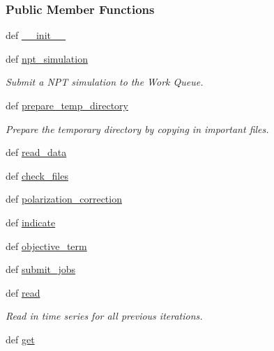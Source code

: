 \subsubsection*{Public Member Functions}
\begin{DoxyCompactItemize}
\item 
def \hyperlink{classforcebalance_1_1tinkerio_1_1Liquid__TINKER_a307529b9902b34a790a8b016e153c7d6}{\-\_\-\-\_\-init\-\_\-\-\_\-}
\item 
def \hyperlink{classforcebalance_1_1tinkerio_1_1Liquid__TINKER_a53a10ac99cdfbf026526ed625d4de809}{npt\-\_\-simulation}
\begin{DoxyCompactList}\small\item\em Submit a N\-P\-T simulation to the Work Queue. \end{DoxyCompactList}\item 
def \hyperlink{classforcebalance_1_1liquid_1_1Liquid_a550ea5869db69be9f3b8f0b83b07d8cb}{prepare\-\_\-temp\-\_\-directory}
\begin{DoxyCompactList}\small\item\em Prepare the temporary directory by copying in important files. \end{DoxyCompactList}\item 
def \hyperlink{classforcebalance_1_1liquid_1_1Liquid_a08b698af913d56f780d0587821c922cd}{read\-\_\-data}
\item 
def \hyperlink{classforcebalance_1_1liquid_1_1Liquid_a50d90e978d689cfebb67649942719b69}{check\-\_\-files}
\item 
def \hyperlink{classforcebalance_1_1liquid_1_1Liquid_a51ea9d9fb4418ec2497fe8e2d8033d41}{polarization\-\_\-correction}
\item 
def \hyperlink{classforcebalance_1_1liquid_1_1Liquid_ae94ce30dfd0e92fdd6d746e6743be844}{indicate}
\item 
def \hyperlink{classforcebalance_1_1liquid_1_1Liquid_a00c23db61bcb86cc19f79dacdb2bc1f3}{objective\-\_\-term}
\item 
def \hyperlink{classforcebalance_1_1liquid_1_1Liquid_a716e28bb5572b3273036ac753b7e1e1d}{submit\-\_\-jobs}
\item 
def \hyperlink{classforcebalance_1_1liquid_1_1Liquid_a121ae6aa86f6eb692e0c23cec82aa734}{read}
\begin{DoxyCompactList}\small\item\em Read in time series for all previous iterations. \end{DoxyCompactList}\item 
def \hyperlink{classforcebalance_1_1liquid_1_1Liquid_a802c4139e5c002fabdeab5de88093880}{get}

\end{DoxyCompactItemize}
